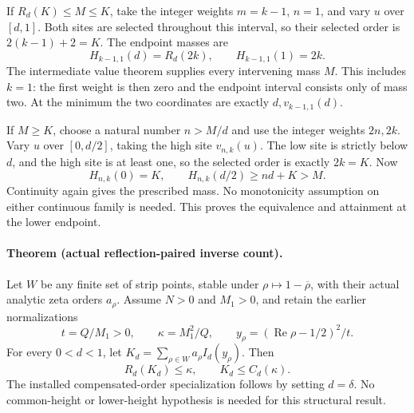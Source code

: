 If \(R_d(K)\le M\le K\), take the integer weights
\(m=k-1\), \(n=1\), and vary \(u\) over \([d,1]\).
Both sites are selected throughout this interval, so their selected order
is \(2(k-1)+2=K\).  The endpoint masses are
\[
 H_{k-1,1}(d)=R_d(2k),\qquad H_{k-1,1}(1)=2k.
\]
The intermediate value theorem supplies every intervening mass \(M\).
This includes \(k=1\): the first weight is then zero and the endpoint
interval consists only of mass two.  At the minimum the two coordinates
are exactly \(d,v_{k-1,1}(d)\).

If \(M\ge K\), choose a natural number \(n>M/d\) and use the integer
weights \(2n,2k\).  Vary \(u\) over \([0,d/2]\), taking the high site
\(v_{n,k}(u)\).  The low site is strictly below \(d\), and the high site
is at least one, so the selected order is exactly \(2k=K\).
Now
\[
 H_{n,k}(0)=K,\qquad
 H_{n,k}(d/2)\ge nd+K>M.
\]
Continuity again gives the prescribed mass.  No monotonicity assumption
on either continuous family is needed.  This proves the equivalence and
attainment at the lower endpoint.

\paragraph{Theorem (actual reflection-paired inverse count).}
Let \(W\) be any finite set of strip points, stable under
\(\rho\mapsto1-\overline\rho\), with their actual analytic zeta orders
\(a_\rho\).  Assume \(N>0\) and \(M_1>0\), and retain the earlier
normalizations
\[
 t=Q/M_1>0,\qquad \kappa=M_1^2/Q,\qquad
 y_\rho=(\operatorname{Re}\rho-1/2)^2/t.
\]
For every \(0<d<1\), let \(K_d=\sum_{\rho\in W}a_\rho I_d(y_\rho)\).
Then
\begin{equation}
 R_d(K_d)\le\kappa,\qquad K_d\le C_d(\kappa).
 \label{eq:actual-threshold-feasibility}
\end{equation}
The installed compensated-order specialization follows by setting
\(d=\delta\).  No common-height or lower-height hypothesis is needed for
this structural result.

